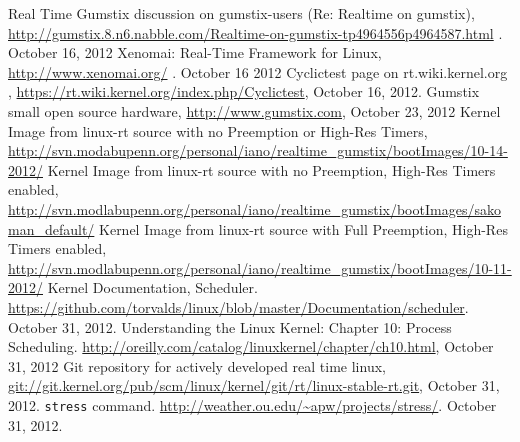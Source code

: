 \begin{thebibliography}{9}
Real Time Gumstix discussion on gumstix-users (Re: Realtime on gumstix), \url{http://gumstix.8.n6.nabble.com/Realtime-on-gumstix-tp4964556p4964587.html} . October 16, 2012
Xenomai: Real-Time Framework for Linux, \url{http://www.xenomai.org/} . October 16 2012
Cyclictest page on rt.wiki.kernel.org , \url{https://rt.wiki.kernel.org/index.php/Cyclictest}, October 16, 2012.
Gumstix small open source hardware, \url{http://www.gumstix.com}, October 23, 2012
Kernel Image from linux-rt source with no Preemption or High-Res Timers, \url{http://svn.modabupenn.org/personal/iano/realtime_gumstix/bootImages/10-14-2012/}
Kernel Image from linux-rt source with no Preemption, High-Res Timers enabled, \url{http://svn.modlabupenn.org/personal/iano/realtime_gumstix/bootImages/sakoman_default/}
Kernel Image from linux-rt source with Full Preemption, High-Res Timers enabled, \url{http://svn.modlabupenn.org/personal/iano/realtime_gumstix/bootImages/10-11-2012/}
Kernel Documentation, Scheduler.  \url{https://github.com/torvalds/linux/blob/master/Documentation/scheduler}. October 31, 2012.
Understanding the Linux Kernel: Chapter 10: Process Scheduling.  \url{http://oreilly.com/catalog/linuxkernel/chapter/ch10.html}, October 31, 2012
Git repository for actively developed real time linux, \url{git://git.kernel.org/pub/scm/linux/kernel/git/rt/linux-stable-rt.git}, October 31, 2012.
\texttt{stress} command. \url{http://weather.ou.edu/~apw/projects/stress/}. October 31, 2012.
\end{thebibliography}


